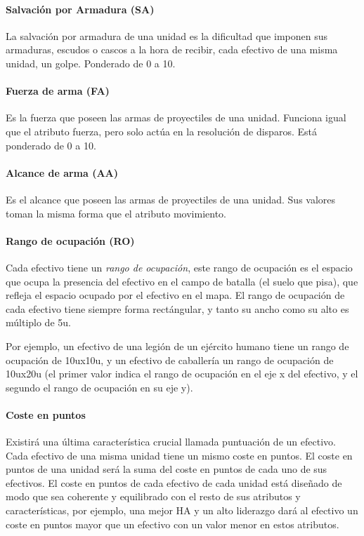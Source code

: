 \paragraph{Salvación por Armadura (SA)}
La salvación por armadura de una unidad es la dificultad que imponen
sus armaduras, escudos o cascos a la hora de recibir, cada efectivo de
una misma unidad, un golpe. Ponderado de 0 a 10.

\paragraph{Fuerza de arma (FA)}
Es la fuerza que poseen las armas de proyectiles de una
unidad. Funciona igual que el atributo fuerza, pero solo actúa en la
resolución de disparos. Está ponderado de 0 a 10.

\paragraph{Alcance de arma (AA)}
Es el alcance que poseen las armas de proyectiles de una unidad. Sus
valores toman la misma forma que el atributo movimiento.

\paragraph{Rango de ocupación (RO)}
Cada efectivo tiene un \emph{rango de ocupación}, este rango de
ocupación es el espacio que ocupa la presencia del efectivo en el
campo de batalla (el suelo que pisa), que refleja el espacio ocupado
por el efectivo en el mapa. El rango de ocupación de cada efectivo
tiene siempre forma rectángular, y tanto su ancho como su alto es
múltiplo de 5u.

Por ejemplo, un efectivo de una legión de un ejército humano tiene un rango de ocupación de 10ux10u, y un efectivo de caballería un rango de ocupación de 10ux20u (el primer valor indica el rango de ocupación en el eje x del efectivo, y el segundo el rango de ocupación en su eje y).

\paragraph{Coste en puntos}
Existirá una última característica crucial llamada puntuación de un efectivo. Cada efectivo de una misma unidad tiene un mismo coste en puntos. El coste en puntos de una unidad será la suma del coste en puntos de cada uno de sus efectivos. El coste en puntos de cada efectivo de cada unidad está diseñado de modo que sea coherente y equilibrado con el resto de sus atributos y características, por ejemplo, una mejor HA y un alto liderazgo dará al efectivo un coste en puntos mayor que un efectivo con un valor menor en estos atributos.

